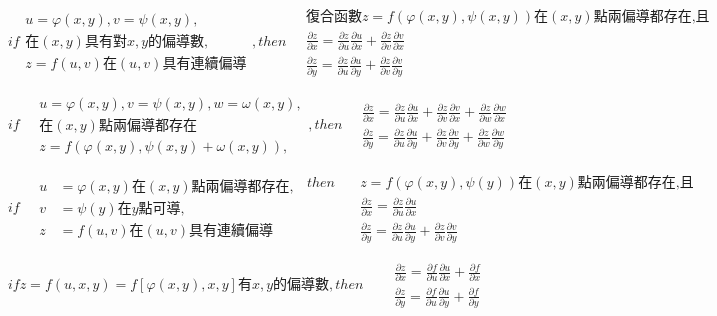 \documentclass[UTF8]{ctexart}
\newcommand{\mt}[1]{\text{#1}}
\newcommand{\mf}[1]{\left( #1\right)}
\newcommand{\mfc}[1]{\left[ #1 \right]}
\newcommand{\q}{\quad}
\newcommand{\qa}{\vspace{12 pt}}
\newcommand{\p}{\par}
\newcommand{\ma}[1]{\begin{array}{llll} #1 \end{array}}
\begin{document}
$if \ma{
    u=\varphi\mf{x,y},v=\psi\mf{x,y},\\
    \mt{在}\mf{x,y}\mt{具有對}x,y\mt{的偏導數},\\
    z=f\mf{u,v}\mt{在}\mf{u,v}\mt{具有連續偏導}
},then \q 
\ma{
    \mt{復合函數}z=f\mf{\varphi\mf{x,y},\psi\mf{x,y}}\mt{在}(x,y)\mt{點兩偏導都存在,且}\\
    \frac{\partial z}{\partial x}=\frac{\partial z}{\partial u}\frac{\partial u}{\partial x}+\frac{\partial z}{\partial v}\frac{\partial v}{\partial x}\\
    \frac{\partial z}{\partial y}=\frac{\partial z}{\partial u}\frac{\partial u}{\partial y}+\frac{\partial z}{\partial v}\frac{\partial v}{\partial y}
}$\p
\qa

$if \q \ma{ u=\varphi\mf{x,y},v=\psi\mf{x,y} ,w=\omega\mf{x,y},\\
\mt{在}\mf{x,y}\mt{點兩偏導都存在} \\
 z=f\mf{\varphi\mf{x,y},\psi\mf{x,y}+\omega\mf{x,y}},},then \q
\ma{ \frac{\partial z}{\partial x}=\frac{\partial z}{\partial u}\frac{\partial u}{\partial x}+\frac{\partial z}{\partial v}\frac{\partial v}{\partial x}+\frac{\partial z}{\partial w}\frac{\partial w}{\partial x}\\
 \frac{\partial z}{\partial y}=\frac{\partial z}{\partial u}\frac{\partial u}{\partial y}+\frac{\partial z}{\partial v}\frac{\partial v}{\partial y}+\frac{\partial z}{\partial w}\frac{\partial w}{\partial y}
}
$\p
\qa


$if \q \ma{u& =\varphi\mf{x,y}\mt{在}\mf{x,y}\mt{點兩偏導都存在},\\
v &=\psi\mf{y} \mt{在}y\mt{點可導} ,\\
z &=f\mf{u,v} \mt{在}\mf{u,v}\mt{具有連續偏導}
} \ma{then \q &z=f\mf{\varphi\mf{x,y},\psi\mf{y} }\mt{在}\mf{x,y}\mt{點兩偏導都存在,且}\\
    &\frac{\partial z}{\partial x}=\frac{\partial z}{\partial u}\frac{\partial u}{\partial x}\\
    &\frac{\partial z}{\partial y}=\frac{\partial z}{\partial u}\frac{\partial u}{\partial y}+\frac{\partial z}{\partial v}\frac{\partial v}{\partial y} 
}$\p
\qa

$if z=f\mf{u,x,y}=f\mfc{\varphi\mf{x,y},x,y} \mt{有}x,y\mt{的偏導數},then \q \ma{
    &\frac{\partial z}{\partial x}=\frac{\partial f}{\partial u}\frac{\partial u}{\partial x}+ \frac{\partial f}{\partial x}\\
    &\frac{\partial z}{\partial y}=\frac{\partial f}{\partial u}\frac{\partial u}{\partial y}+\frac{\partial f}{\partial y} 

}$\p
\end{document}
